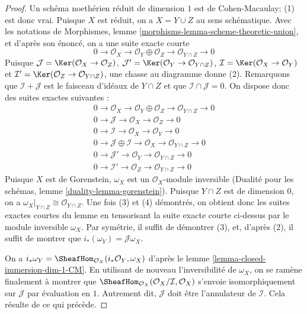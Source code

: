 \begin{proof}
Un schéma noethérien réduit de dimension $1$ est de Cohen-Macaulay; (1) est donc vrai. Puisque $X$ est réduit, on a $X = Y \cup Z$ au sens schématique. Avec les notations de Morphismes, lemme \ref{morphisms-lemma-scheme-theoretic-union}, et d'après son énoncé, on a une suite exacte courte $$
0 \to \mathcal{O}_X \to
\mathcal{O}_Y \oplus \mathcal{O}_Z \to \mathcal{O}_{Y \cap Z} \to 0
$$ Puisque $\mathcal{J} = \Ker(\mathcal{O}_X \to \mathcal{O}_Z)$, $\mathcal{J}' = \Ker(\mathcal{O}_Y \to \mathcal{O}_{Y \cap Z})$, $\mathcal{I} = \Ker(\mathcal{O}_X \to \mathcal{O}_Y)$ et $\mathcal{I}' = \Ker(\mathcal{O}_Z \to \mathcal{O}_{Y \cap Z})$, une chasse au diagramme donne (2). Remarquons que $\mathcal{I} + \mathcal{J}$ est le faisceau d'idéaux de $Y \cap Z$ et que $\mathcal{I} \cap \mathcal{J} = 0$. On dispose donc des suites exactes suivantes : \begin{align*}
0 \to \mathcal{O}_X \to \mathcal{O}_Y \oplus \mathcal{O}_Z \to
\mathcal{O}_{Y \cap Z} \to 0 \\
0 \to \mathcal{J} \to \mathcal{O}_X \to \mathcal{O}_Z \to 0 \\
0 \to \mathcal{I} \to \mathcal{O}_X \to \mathcal{O}_Y \to 0 \\
0 \to \mathcal{J} \oplus \mathcal{I} \to \mathcal{O}_X \to
\mathcal{O}_{Y \cap Z} \to 0 \\
0 \to \mathcal{J}' \to \mathcal{O}_Y \to \mathcal{O}_{Y \cap Z} \to 0 \\
0 \to \mathcal{I}' \to \mathcal{O}_Z \to \mathcal{O}_{Y \cap Z} \to 0
\end{align*} Puisque $X$ est de Gorenstein, $\omega_X$ est un $\mathcal{O}_X$-module inversible (Dualité pour les schémas, lemme \ref{duality-lemma-gorenstein}). Puisque $Y \cap Z$ est de dimension $0$, on a $\omega_X|_{Y \cap Z} \cong \mathcal{O}_{Y \cap Z}$. Une fois (3) et (4) démontrés, on obtient donc les suites exactes courtes du lemme en tensorisant la suite exacte courte ci-dessus par le module inversible $\omega_X$. Par symétrie, il suffit de démontrer (3), et, d'après (2), il suffit de montrer que $i_*(\omega_Y) = \mathcal{J}\omega_X$.

\medskip\noindent
On a $i_*\omega_Y = \SheafHom_{\mathcal{O}_X}(i_*\mathcal{O}_Y, \omega_X)$ d'après le lemme \ref{lemma-closed-immersion-dim-1-CM}. En utilisant de nouveau l'inversibilité de $\omega_X$, on se ramène finalement à montrer que $\SheafHom_{\mathcal{O}_X}(\mathcal{O}_X/\mathcal{I}, \mathcal{O}_X)$ s'envoie isomorphiquement sur $\mathcal{J}$ par évaluation en $1$. Autrement dit, $\mathcal{J}$ doit être l'annulateur de $\mathcal{I}$. Cela résulte de ce qui précède.
\end{proof}







